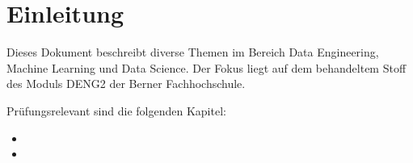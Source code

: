 \newpage
\section{Einleitung}
\label{sec:stat}


Dieses Dokument beschreibt diverse Themen im Bereich Data Engineering, Machine Learning und Data Science. Der Fokus liegt auf dem behandeltem Stoff des Moduls DENG2 der Berner Fachhochschule.

Prüfungsrelevant sind die folgenden Kapitel:

\begin{itemize}
  \item {}
  \item {}
\end{itemize}
